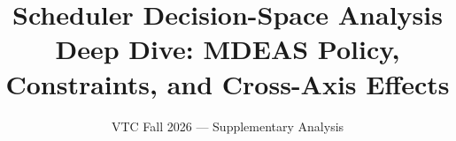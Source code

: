 \documentclass[conference,10pt]{IEEEtran}
\begin{document}
\title{Scheduler Decision-Space Analysis\\
{\normalsize Deep Dive: MDEAS Policy, Constraints, and Cross-Axis Effects}}
\author{VTC Fall 2026 — Supplementary Analysis}
\maketitle


\end{document}
